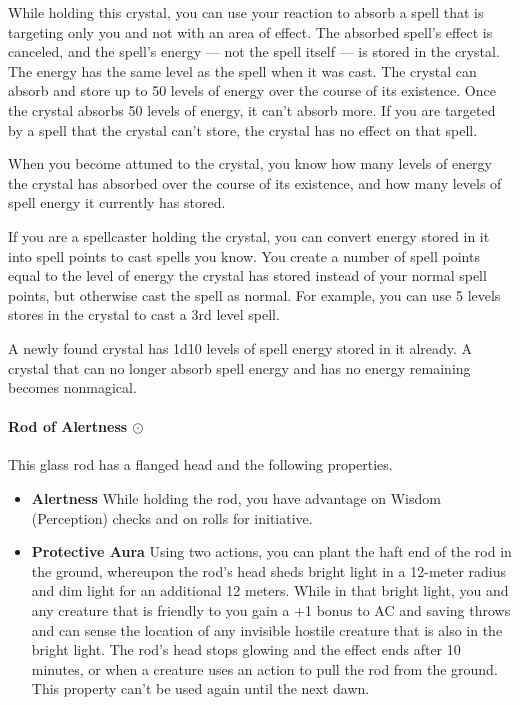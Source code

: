     While holding this crystal, you can use your reaction to absorb a spell that is targeting only you and not with an area of effect.
    The absorbed spell's effect is canceled, and the spell's energy --- not the spell itself --- is stored in the crystal.
    The energy has the same level as the spell when it was cast.
    The crystal can absorb and store up to 50 levels of energy over the course of its existence.
    Once the crystal absorbs 50 levels of energy, it can't absorb more.
    If you are targeted by a spell that the crystal can't store, the crystal has no effect on that spell.

    When you become attuned to the crystal, you know how many levels of energy the crystal has absorbed over the course of its existence, and how many levels of spell energy it currently has stored.

    If you are a spellcaster holding the crystal, you can convert energy stored in it into spell points to cast spells you know.
    You create a number of spell points equal to the level of energy the crystal has stored instead of your normal spell points, but otherwise cast the spell as normal.
    For example, you can use 5 levels stores in the crystal to cast a 3rd level spell.

    A newly found crystal has 1d10 levels of spell energy stored in it already.
    A crystal that can no longer absorb spell energy and has no energy remaining becomes nonmagical.
\paragraph{Rod of Alertness $\odot$}
    This glass rod has a flanged head and the following properties.
    \begin{itemize}
        \item \textbf{Alertness}
        While holding the rod, you have advantage on Wisdom (Perception) checks and on rolls for initiative.
        \item \textbf{Protective Aura} Using two actions, you can plant the haft end of the rod in the ground, whereupon the rod's head sheds bright light in a 12-meter radius and dim light for an additional 12 meters.
        While in that bright light, you and any creature that is friendly to you gain a +1 bonus to AC and saving throws and can sense the location of any invisible hostile creature that is also in the bright light.
        The rod's head stops glowing and the effect ends after 10 minutes, or when a creature uses an action to pull the rod from the ground.
        This property can't be used again until the next dawn.
    \end{itemize}

